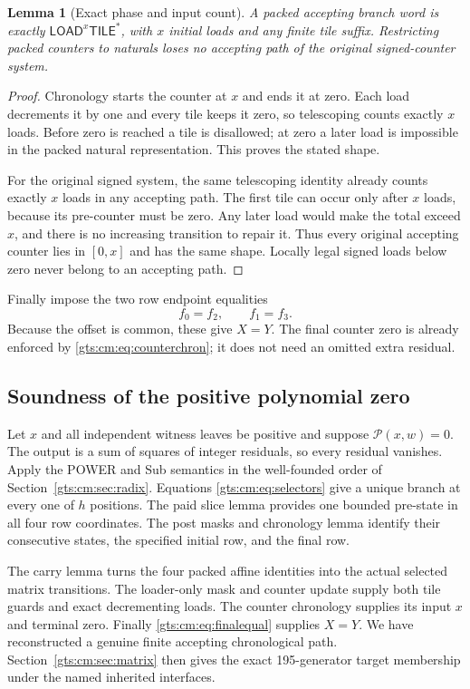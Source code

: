 \documentclass[11pt,letterpaper]{article}
\newtheorem{lemma}[theorem]{Lemma}
\theoremstyle{definition}
\theoremstyle{remark}
\newcommand{\LOAD}{\mathsf{LOAD}}
\newcommand{\TILE}{\mathsf{TILE}}
\begin{document}
\begin{lemma}[Exact phase and input count]\label{gts:cm:lem:counter}
A packed accepting branch word is exactly $\LOAD^x\TILE^*$, with $x$ initial loads and any finite tile suffix. Restricting packed counters to naturals loses no accepting path of the original signed-counter system.
\end{lemma}
\begin{proof}
Chronology starts the counter at $x$ and ends it at zero. Each load decrements it by one and every tile keeps it zero, so telescoping counts exactly $x$ loads. Before zero is reached a tile is disallowed; at zero a later load is impossible in the packed natural representation. This proves the stated shape.

For the original signed system, the same telescoping identity already counts exactly $x$ loads in any accepting path. The first tile can occur only after $x$ loads, because its pre-counter must be zero. Any later load would make the total exceed $x$, and there is no increasing transition to repair it. Thus every original accepting counter lies in $[0,x]$ and has the same shape. Locally legal signed loads below zero never belong to an accepting path.
\end{proof}
Finally impose the two row endpoint equalities
\begin{equation}\label{gts:cm:eq:finalequal}
 f_0=f_2,\qquad f_1=f_3.
\end{equation}
Because the offset is common, these give $X=Y$. The final counter zero is already enforced by \eqref{gts:cm:eq:counterchron}; it does not need an omitted extra residual.

\subsection{Soundness of the positive polynomial zero}
Let $x$ and all independent witness leaves be positive and suppose $\mathcal P(x,w)=0$. The output is a sum of squares of integer residuals, so every residual vanishes. Apply the POWER and Sub semantics in the well-founded order of Section~\ref{gts:cm:sec:radix}. Equations \eqref{gts:cm:eq:selectors} give a unique branch at every one of $h$ positions. The paid slice lemma provides one bounded pre-state in all four row coordinates. The post masks and chronology lemma identify their consecutive states, the specified initial row, and the final row.

The carry lemma turns the four packed affine identities into the actual selected matrix transitions. The loader-only mask and counter update supply both tile guards and exact decrementing loads. The counter chronology supplies its input $x$ and terminal zero. Finally \eqref{gts:cm:eq:finalequal} supplies $X=Y$. We have reconstructed a genuine finite accepting chronological path. Section~\ref{gts:cm:sec:matrix} then gives the exact 195-generator target membership under the named inherited interfaces.
\end{document}
